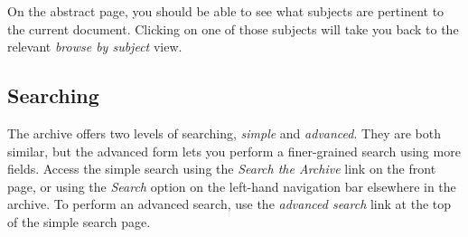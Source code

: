 On the abstract page, you should be able to see what subjects are pertinent to the current document. Clicking on one of those subjects will take you back to the relevant \emph{browse by subject} view.


\subsection{Searching}

The archive offers two levels of searching, \emph{simple} and \emph{advanced}. They are both similar, but the advanced form lets you perform a finer-grained search using more fields. Access the simple search using the \emph{Search the Archive} link on the front page, or using the \emph{Search} option on the left-hand navigation bar elsewhere in the archive. To perform an advanced search, use the \emph{advanced search} link at the top of the simple search page.

